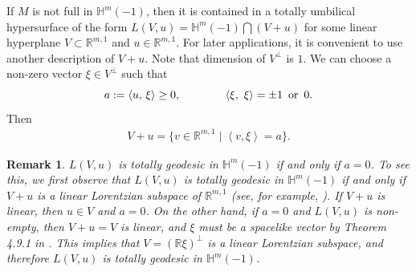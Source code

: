 \documentclass[12pt]{article}
\newtheorem{rmk}[lem]{Remark}
\begin{document}
If $M$ is not full in $\mathbb{H}^m(-1)$, then it is contained in a totally umbilical hypersurface
of the form $L(V, u) =  \mathbb{H}^m(-1) \bigcap (V+u)$ for some linear hyperplane $V \subset \mathbb{R}^{m,1}$
and $u \in \mathbb{R}^{m,1}$. For later applications, it is convenient to use another description
of $V+u$. Note that dimension of $V^\perp$ is $1$. We can choose
a non-zero vector $\xi \in V^\perp$ such that
\begin{equation} \label{eqn:condxi}
 a := \left<u, \, \xi \right> \geq 0, \hspace{40pt}  \langle\xi, \,\, \xi\rangle = \pm 1 \,\,\, {\rm or} \,\,\, 0.
\end{equation}
Then
\begin{align} \label{eqn:V+u}
	 		V+u=\{v\in\mathbb R^{m,1}\mid \left<v,\xi \right>=a\}.
\end{align}






\begin{rmk} \label{rem:LV-geo}
$L(V, u)$ is totally geodesic in $\mathbb{H}^m(-1)$ if and only if $a=0$. To see this, we first observe
 that $L(V, u)$ is totally geodesic in $\mathbb{H}^m(-1)$ if and only if
$V+u$ is a linear Lorentzian subspace of $\mathbb{R}^{m,1}$ (see, for example, \cite{BCO}).
If $V+u$ is linear, then $u \in V$ and $a=0$. On the other hand, if $a=0$ and $L(V, u)$ is non-empty,
then $V+u=V$ is linear,
and $\xi$ must be a spacelike vector by Theorem 4.9.1 in \cite{N.S}.
This implies that $V = (\mathbb{R} \xi)^\perp$ is a linear Lorentzian subspace, and
therefore $L(V, u)$ is totally geodesic in $\mathbb{H}^m(-1)$.
\end{rmk}
\end{document}
